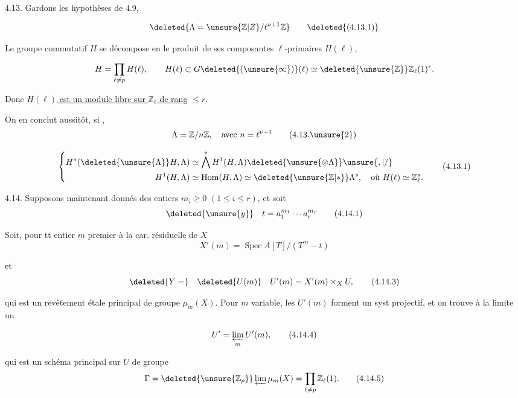 
4.13. Gardons les hypothèses de 4.9, 

\[
\deleted{\Lambda=\unsure{\mathbb{Z}|Z}/\ell^{\nu+1}\mathbb{Z}}
\tag*{\deleted{(4.13.1)}}
\]

Le groupe commutatif $H$ se décompose en le produit de ses composantes $\ell$-primaires $H(\ell)$,

\[
H=\prod_{\ell\ne p}H(\ell),\qquad H(\ell)\subset G\deleted{(\unsure{\infty})}(\ell)\simeq\deleted{\unsure{\mathbb{Z}}}\mathbb{Z}_\ell(1)^r.
\]

Donc \uline{$H(\ell)$ est un module libre sur $\mathbb{Z}_\ell$ de rang} $\leq r$.

On en conclut  aussitôt, si ,  
\[
\Lambda=\mathbb{Z}/n\mathbb{Z},\quad\text{avec }n=\ell^{\nu+1}
\tag*{(4.13.\unsure{2})}
\]

\[
\left\{\begin{aligned}
H^*(\deleted{\unsure{\Lambda}}H,\Lambda)&\simeq\bigwedge^*H^1(H,\Lambda)\deleted{\unsure{\otimes\Lambda}}\unsure{,|/}\\
H^1(H,\Lambda)&\simeq\operatorname{Hom}(H,\Lambda)\simeq\deleted{\unsure{\mathbb{Z}|*}}\Lambda^s,\quad\text{où }H(\ell)\simeq\mathbb{Z}_\ell^s.
\end{aligned}\right.
\tag*{(4.13.1)}
\]

4.14.   Supposons maintenant donnés des entiers $m_i\geq0$ $(1\leq i\leq r)$, et  soit
\[
\deleted{\unsure{y}}\quad t=a_1^{m_1}\cdots a_r^{m_r}
\tag*{(4.14.1)}
\]

Soit, pour tt entier $m$ premier à la car. résiduelle de $X$
\[
X'(m)=\operatorname{Spec}A[T]/(T^m-t)
\tag*{(4.14.2)}
\]

et 
\[
\deleted{Y=}\quad\deleted{U(m)}\quad U'(m)=X'(m)\times_X U,
\tag*{(4.14.3)}
\]

qui est un revêtement étale principal  de groupe $\mu_m(X)$. Pour $m$ variable, les  $U'(m)$ forment un syst projectif, et on trouve à la limite un

\[
U'=\varprojlim_m U'(m),
\tag*{(4.14.4)}
\]

qui est un schéma principal sur $U$ de groupe
\[
\Gamma=\deleted{\unsure{\mathbb{Z}_p}}\varprojlim\mu_m(X)=\prod_{\ell\ne p}\mathbb{Z}_\ell(1).
\tag*{(4.14.5)}
\]
